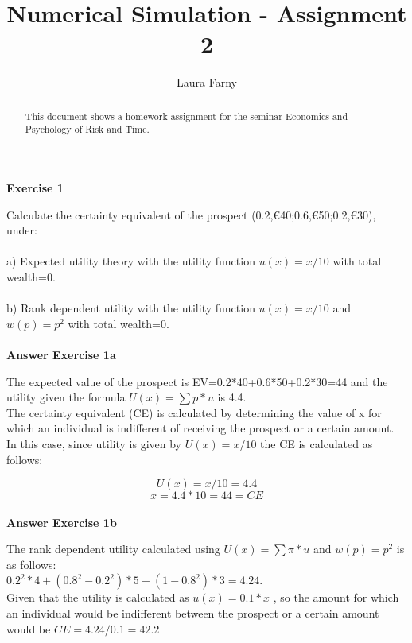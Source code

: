 \documentclass[12pt]{article}
\begin{document}
	
\title{Numerical Simulation - Assignment 2}
\author{Laura Farny}

{}


\begin{abstract}
	This document shows a homework assignment for the seminar Economics and Psychology of Risk and Time.
	
\end{abstract}

\textbf {Exercise 1\\}

Calculate the certainty equivalent of the prospect (0.2,€40;0.6,€50;0.2,€30), under: \\
\\
a) Expected utility theory with the utility function $u(x) =x/10$ with total wealth=0. \\
\\
b) Rank dependent utility with the utility function $u(x) =x/10$ and $w(p) = p^{2}$ with total wealth=0. \\
\\


\textbf {Answer Exercise 1a\\}

The expected value of the prospect is EV=0.2*40+0.6*50+0.2*30=44 and the utility given the formula $U(x)=\sum p*u$ is 4.4.\\
The certainty equivalent (CE) is calculated by determining the value of x for which an individual is indifferent of receiving the prospect or a certain amount. In this case, since utility is given by $U(x)=x/10$  the CE is calculated as follows:

\[U(x)=x/10 =4.4\]
\[x=4.4*10=44=CE\]\\


\textbf {Answer Exercise 1b\\}

The rank dependent utility calculated using $U(x)=\sum \pi *u$ and $w(p)=p^{2}$ is as follows: \\
\(0.2^{2}*4 + (0.8^{2}-0.2^{2})*5 + (1-0.8^{2})*3 = 4.24\). \\
Given that the utility is calculated as $u(x)=0.1*x$ , so the amount for which an individual would be indifferent between the prospect or a certain amount would be $CE=4.24/0.1=42.2$\\
\\
\\
\end{document}
